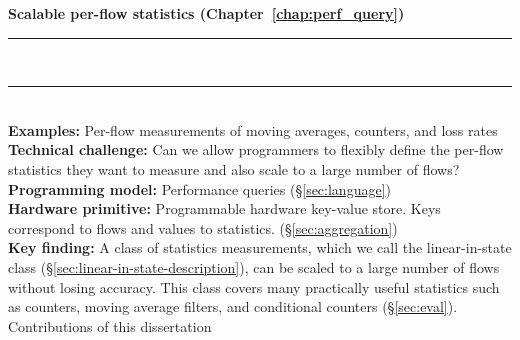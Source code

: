 \begin{table}
\textbf{Scalable per-flow statistics (Chapter~\ref{chap:perf_query})}
\\[-7pt]\rule{\textwidth}{1pt}\\[-7pt]\rule{\textwidth}{1pt} \\
\textbf{Examples:} Per-flow measurements of moving averages, counters, and loss rates \\
\textbf{Technical challenge:} Can we allow programmers to flexibly define the
per-flow statistics they want to measure and also scale to a large number of
flows?\\
\textbf{Programming model:} Performance queries (\S\ref{sec:language}) \\
\textbf{Hardware primitive:} Programmable hardware key-value store. Keys correspond to
flows and values to statistics. (\S\ref{sec:aggregation}) \\
\textbf{Key finding:} A class of statistics measurements, which we call the
linear-in-state class (\S\ref{sec:linear-in-state-description}), can be scaled
to a large number of flows without losing accuracy. This class covers many
practically useful statistics such as counters, moving average filters, and
conditional counters (\S\ref{sec:eval}). \\
\caption{Contributions of this dissertation}
\label{tab:contributions}
\end{table}
